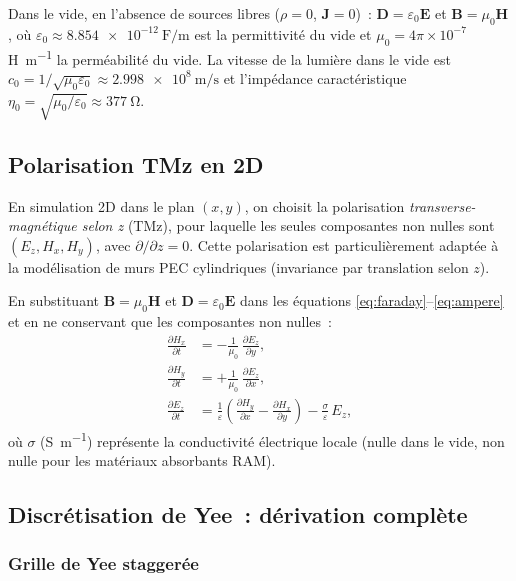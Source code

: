 \documentclass[12pt,a4paper]{article}
\newcommand{\vE}{\bm{E}}
\newcommand{\vH}{\bm{H}}
\newcommand{\vB}{\bm{B}}
\newcommand{\vD}{\bm{D}}
\newcommand{\vJ}{\bm{J}}
\newcommand{\Ez}{{E_z}}
\newcommand{\Hx}{{H_x}}
\newcommand{\Hy}{{H_y}}
\newcommand{\eps}{\varepsilon}
\newcommand{\muo}{\mu_0}
\newcommand{\epso}{\varepsilon_0}
\newcommand{\etao}{\eta_0}
\begin{document}
Dans le vide, en l'absence de sources libres ($\rho = 0$, $\vJ = 0$)~:
$\vD = \epso \vE$ et $\vB = \muo \vH$, où $\epso \approx \SI{8.854e-12}{\farad\per\metre}$
est la permittivité du vide et $\muo = 4\pi \times 10^{-7}$ \si{\henry\per\metre} la
perméabilité du vide. La vitesse de la lumière dans le vide est $c_0 = 1/\sqrt{\muo\epso}
\approx \SI{2.998e8}{\metre\per\second}$ et l'impédance caractéristique
$\etao = \sqrt{\muo/\epso} \approx \SI{377}{\ohm}$.

\subsection{Polarisation TMz en 2D}
\label{ssec:tmz}

En simulation 2D dans le plan $(x,y)$, on choisit la polarisation
\textit{transverse-magnétique selon z} (TMz), pour laquelle les seules composantes
non nulles sont $(\Ez, \Hx, \Hy)$, avec $\partial/\partial z = 0$. Cette polarisation
est particulièrement adaptée à la modélisation de murs PEC cylindriques (invariance
par translation selon $z$).

En substituant $\vB = \muo\vH$ et $\vD = \epso\vE$ dans les équations
\eqref{eq:faraday}--\eqref{eq:ampere} et en ne conservant que les composantes
non nulles~:
\begin{align}
    \frac{\partial \Hx}{\partial t} &= -\frac{1}{\muo}\,\frac{\partial \Ez}{\partial y},
    \label{eq:tmz-hx}\\[4pt]
    \frac{\partial \Hy}{\partial t} &= +\frac{1}{\muo}\,\frac{\partial \Ez}{\partial x},
    \label{eq:tmz-hy}\\[4pt]
    \frac{\partial \Ez}{\partial t} &= \frac{1}{\eps}\left(
        \frac{\partial \Hy}{\partial x} - \frac{\partial \Hx}{\partial y}\right)
        - \frac{\sigma}{\eps}\,\Ez,
    \label{eq:tmz-ez}
\end{align}
où $\sigma$ (\si{\siemens\per\metre}) représente la conductivité électrique locale
(nulle dans le vide, non nulle pour les matériaux absorbants RAM).

\subsection{Discrétisation de Yee~: dérivation complète}
\label{ssec:yee}

\subsubsection{Grille de Yee staggerée}
\end{document}
